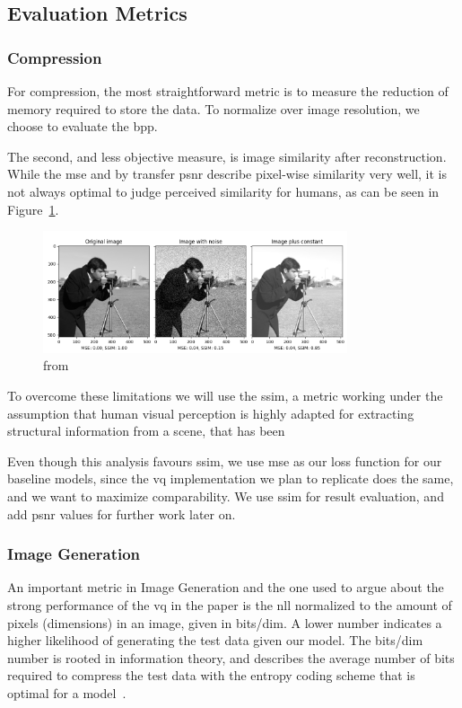 \subsection{Evaluation Metrics}\label{subsec:evaluation-metrics}

\subsubsection{Compression}
For compression, the most straightforward metric is to measure the reduction of memory required to
store the data.
To normalize over image resolution, we choose to evaluate the \ac{bpp}.

The second, and less objective measure, is image similarity after reconstruction.
While the \ac{mse} and by transfer \ac{psnr} describe pixel-wise similarity very well, it is not
always optimal to judge perceived similarity for humans, as can be seen in Figure~\ref{fig:mse_ssim}.

\begin{figure}[ht]
    \centering
    \includegraphics[width=0.8\textwidth]{images/ssim_mse}
    \caption{from~\cite{scikit-ssim}}
    \label{fig:mse_ssim}
\end{figure}

To overcome these limitations we will use the \ac{ssim}, a metric working under the assumption that human visual
perception is highly adapted for extracting structural information from a scene, that has been

Even though this analysis favours \ac{ssim}, we use \ac{mse} as our loss function for our baseline models,
since the \ac{vq} implementation we plan to replicate does the same, and we want to maximize comparability.
We use \ac{ssim} for result evaluation, and add \ac{psnr} values for further work later on.

\subsubsection{Image Generation}
An important metric in Image Generation and the one used to argue about the strong performance of the \ac{vq} in the
paper is the \ac{nll} normalized to the amount of pixels (dimensions) in an image, given in bits/dim.
A lower number indicates a higher likelihood of generating the test data given our model.
The bits/dim number is rooted in information theory, and describes the average number of bits required to
compress the test data with the entropy coding scheme that is optimal for a model~\cite{shannon}.

